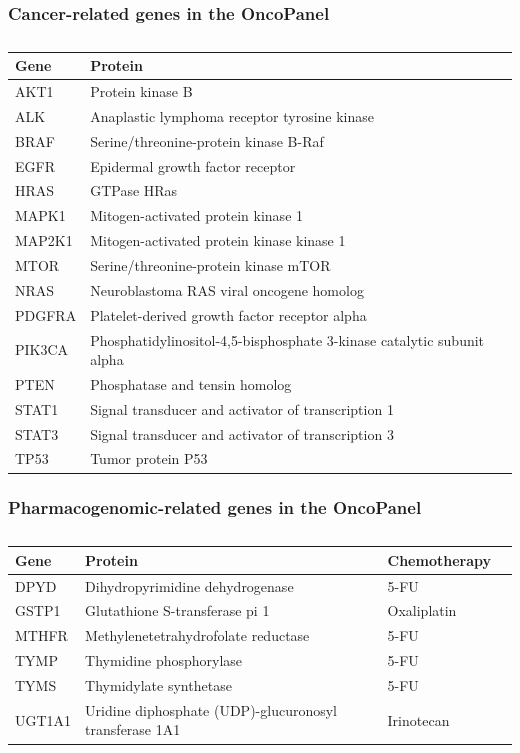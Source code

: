 \documentclass{beamer}
\begin{document}
\begin{frame}
\frametitle{Cancer-related genes in the OncoPanel}
\scriptsize
\begin{table}
    \caption{}
    \centering
    \begin{tabular}{lll}
    \hline
    Gene & Protein \\
    \hline
    AKT1 & Protein kinase B \\
    ALK & Anaplastic lymphoma receptor tyrosine kinase \\
    BRAF & Serine/threonine-protein kinase B-Raf \\
    EGFR & Epidermal growth factor receptor \\
    HRAS & GTPase HRas \\
    MAPK1 & Mitogen-activated protein kinase 1 \\
    MAP2K1 & Mitogen-activated protein kinase kinase 1 \\
    MTOR & Serine/threonine-protein kinase mTOR \\
    NRAS & Neuroblastoma RAS viral oncogene homolog \\
    PDGFRA & Platelet-derived growth factor receptor alpha \\
    PIK3CA & Phosphatidylinositol-4,5-bisphosphate 3-kinase catalytic subunit alpha \\
    PTEN & Phosphatase and tensin homolog \\
    STAT1 & Signal transducer and activator of transcription 1 \\
    STAT3 & Signal transducer and activator of transcription 3 \\
    TP53 & Tumor protein P53 \\
    \hline
    \end{tabular}
\end{table}
\end{frame}

\begin{frame}
\frametitle{Pharmacogenomic-related genes in the OncoPanel}
\scriptsize
\begin{table}
    \caption{}
    \centering
    \begin{tabular}{llll}
    \hline
    Gene & Protein & Chemotherapy \\
    \hline
    DPYD & Dihydropyrimidine dehydrogenase & 5-FU \\
    GSTP1 & Glutathione S-transferase pi 1 & Oxaliplatin \\
    MTHFR & Methylenetetrahydrofolate reductase & 5-FU \\
    TYMP & Thymidine phosphorylase & 5-FU \\
    TYMS & Thymidylate synthetase & 5-FU \\
    UGT1A1 & Uridine diphosphate (UDP)-glucuronosyl transferase 1A1 & Irinotecan \\
    \hline
    \end{tabular}
\end{table}
\end{frame}
\end{document}
